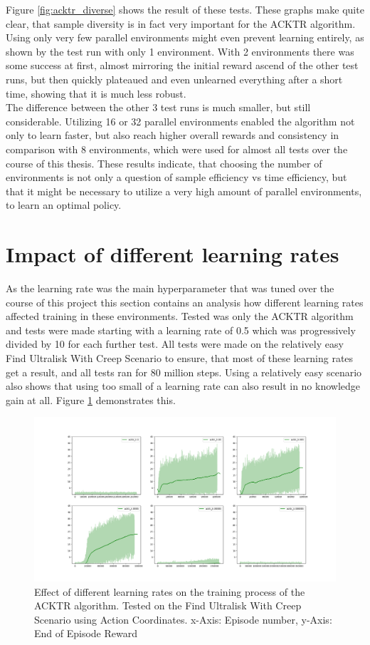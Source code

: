 Figure \ref{fig:acktr_diverse} shows the result of these tests. These graphs make quite clear, that sample diversity is in fact very important for the ACKTR algorithm. Using only very few  parallel environments might even prevent learning entirely, as shown by the test run with only 1 environment. With 2 environments there was some success at first, almost mirroring the initial reward ascend of the other test runs, but then quickly plateaued and even unlearned everything after a short time, showing that it is much less robust. \\ The difference between the other 3 test runs is much smaller, but still considerable. Utilizing 16 or 32 parallel environments enabled the algorithm not only to learn faster, but also reach higher overall rewards and consistency in comparison with 8 environments, which were used for almost all tests over the course of this thesis. These results indicate, that choosing the number of environments is not only a question of sample efficiency vs time efficiency, but that it might be necessary to utilize a very high amount of parallel environments, to learn an optimal policy.


\section{Impact of different learning rates}
\label{sec:lr}
As the learning rate was the main hyperparameter that was tuned over the course of this project this section contains an analysis how different learning rates affected training in these environments. Tested was only the ACKTR algorithm and tests were made starting with a learning rate of 0.5 which was progressively divided by 10 for each further test. All tests were made on the relatively easy Find Ultralisk With Creep Scenario to ensure, that most of these learning rates get a result, and all tests ran for 80 million steps. Using a relatively easy scenario also shows that using too small of a learning rate can also result in no knowledge gain at all. Figure \ref{fig:acktr_lr} demonstrates this. 

\begin{figure}[htb]
  \centering
      \includegraphics[width=1\textwidth]{Figures/plots/acktr_lr.png}
  \caption{Effect of different learning rates on the training process of the ACKTR algorithm. Tested on the Find Ultralisk With Creep Scenario using Action Coordinates. x-Axis: Episode number, y-Axis: End of Episode Reward}
  \label{fig:acktr_lr}
\end{figure}

